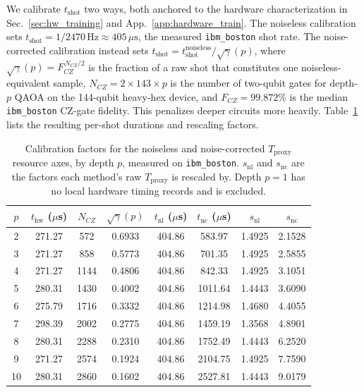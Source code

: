 We calibrate $t_{\text{shot}}$ two ways, both anchored to the
hardware characterization in Sec.~\ref{sec:hw_training} and
App.~\ref{app:hardware_train}. The noiseless calibration sets
$t_{\text{shot}} = 1/2470\,\text{Hz} \approx 405\,\mu\text{s}$, the
measured \texttt{ibm\_boston} shot rate. The noise-corrected
calibration instead sets $t_{\text{shot}} =
t_{\text{shot}}^{\text{noiseless}} / \sqrt{\gamma}(p)$, where
$\sqrt{\gamma}(p) = F_{CZ}^{\,N_{CZ}/2}$ is the fraction of a raw
shot that constitutes one noiseless-equivalent sample, $N_{CZ} = 2
\times 143 \times p$ is the number of two-qubit gates for depth-$p$
QAOA on the 144-qubit heavy-hex device, and $F_{CZ} = 99.872\%$ is
the median \texttt{ibm\_boston} CZ-gate fidelity. This penalizes
deeper circuits more heavily. Table~\ref{tab:calibration} lists the
resulting per-shot durations and rescaling factors.

\begin{table}[t]
    \centering
    \caption{Calibration factors for the noiseless and
    noise-corrected $T_{\text{proxy}}$ resource axes, by depth $p$,
    measured on \texttt{ibm\_boston}. $s_{\text{nl}}$ and
    $s_{\text{nc}}$ are the factors each method's raw
    $T_{\text{proxy}}$ is rescaled by. Depth $p=1$ has no local
    hardware timing records and is excluded.}
    \label{tab:calibration}
    \begin{tabular}{cccccccc}
        \hline
        $p$ & $t_{\text{hw}}$ ($\mu$s) & $N_{CZ}$ & $\sqrt{\gamma}(p)$ & $t_{\text{nl}}$ ($\mu$s) & $t_{\text{nc}}$ ($\mu$s) & $s_{\text{nl}}$ & $s_{\text{nc}}$ \\
        \hline
        2  & 271.27 & 572  & 0.6933 & 404.86 & 583.97  & 1.4925 & 2.1528 \\
        3  & 271.27 & 858  & 0.5773 & 404.86 & 701.35  & 1.4925 & 2.5855 \\
        4  & 271.27 & 1144 & 0.4806 & 404.86 & 842.33  & 1.4925 & 3.1051 \\
        5  & 280.31 & 1430 & 0.4002 & 404.86 & 1011.64 & 1.4443 & 3.6090 \\
        6  & 275.79 & 1716 & 0.3332 & 404.86 & 1214.98 & 1.4680 & 4.4055 \\
        7  & 298.39 & 2002 & 0.2775 & 404.86 & 1459.19 & 1.3568 & 4.8901 \\
        8  & 280.31 & 2288 & 0.2310 & 404.86 & 1752.49 & 1.4443 & 6.2520 \\
        9  & 271.27 & 2574 & 0.1924 & 404.86 & 2104.75 & 1.4925 & 7.7590 \\
        10 & 280.31 & 2860 & 0.1602 & 404.86 & 2527.81 & 1.4443 & 9.0179 \\
        \hline
    \end{tabular}
\end{table}

